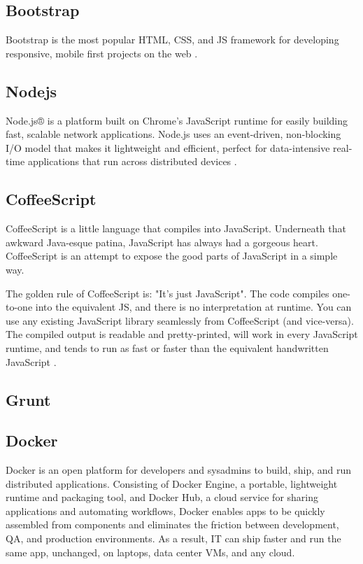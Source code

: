 	\subsection{Bootstrap}
	Bootstrap is the most popular HTML, CSS, and JS framework for developing responsive, mobile first projects on the web \cite{technology_bootstrap}.
	
	\subsection{Nodejs}
	Node.js® is a platform built on Chrome's JavaScript runtime for easily building fast, scalable network applications. Node.js uses an event-driven, non-blocking I/O model that makes it lightweight and efficient, perfect for data-intensive real-time applications that run across distributed devices \cite{technology_nodejs}.
	
	\subsection{CoffeeScript}
	CoffeeScript is a little language that compiles into JavaScript. Underneath that awkward Java-esque patina, JavaScript has always had a gorgeous heart. CoffeeScript is an attempt to expose the good parts of JavaScript in a simple way.
	
	The golden rule of CoffeeScript is: "It's just JavaScript". The code compiles one-to-one into the equivalent JS, and there is no interpretation at runtime. You can use any existing JavaScript library seamlessly from CoffeeScript (and vice-versa). The compiled output is readable and pretty-printed, will work in every JavaScript runtime, and tends to run as fast or faster than the equivalent handwritten JavaScript \cite{technology_coffeescript}.
	
	\subsection{Grunt} 
	\cite{technology_gruntjs}
	
	\subsection{Docker}
	Docker is an open platform for developers and sysadmins to build, ship, and run distributed applications. Consisting of Docker Engine, a portable, lightweight runtime and packaging tool, and Docker Hub, a cloud service for sharing applications and automating workflows, Docker enables apps to be quickly assembled from components and eliminates the friction between development, QA, and production environments. As a result, IT can ship faster and run the same app, unchanged, on laptops, data center VMs, and any cloud\cite{technology_docker}.
	
